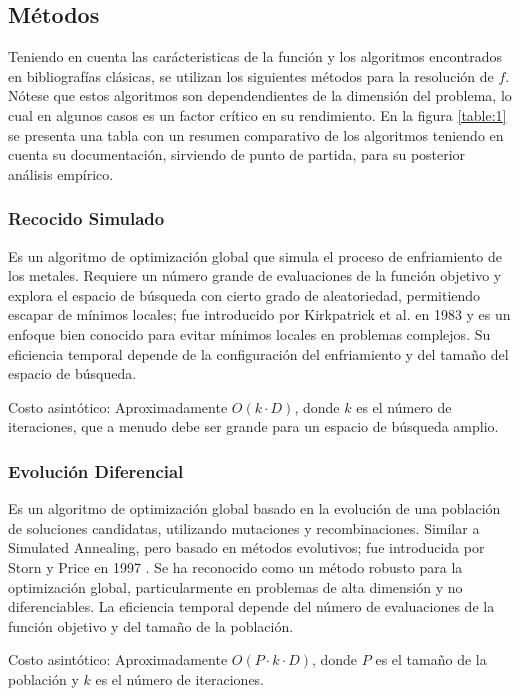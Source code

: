 \documentclass[10pt,a4paper,twocolumn]{article}
\begin{document}
		\subsection{Métodos}
		
			Teniendo en cuenta las carácteristicas de la función y los algoritmos encontrados en bibliografías clásicas, se utilizan los siguientes métodos para la resolución de $f$. Nótese que estos algoritmos son dependendientes de la dimensión del problema, lo cual en algunos casos es un factor crítico en su rendimiento. En la figura \ref*{table:1} se presenta una tabla con un resumen comparativo de los algoritmos teniendo en cuenta su documentación, sirviendo de punto de partida, para su posterior análisis empírico.
			
			\subsubsection{Recocido Simulado}
				Es un algoritmo de optimización global que simula el proceso de enfriamiento de los metales. Requiere un número grande de evaluaciones de la función objetivo y explora el espacio de búsqueda con cierto grado de aleatoriedad, permitiendo escapar de mínimos locales; fue introducido por Kirkpatrick et al. en 1983 \cite{kirkpatrick1983optimization} y es un enfoque bien conocido para evitar mínimos locales en problemas complejos. Su eficiencia temporal depende de la configuración del enfriamiento y del tamaño del espacio de búsqueda.
				
				Costo asintótico: Aproximadamente $ O(k \cdot D) $, donde $ k $ es el número de iteraciones, que a menudo debe ser grande para un espacio de búsqueda amplio.
				
				
			\subsubsection{Evolución Diferencial}
				Es un algoritmo de optimización global basado en la evolución de una población de soluciones candidatas, utilizando mutaciones y recombinaciones. Similar a Simulated Annealing, pero basado en métodos evolutivos; fue introducida por Storn y Price en 1997 \cite{storn1997differential}. Se ha reconocido como un método robusto para la optimización global, particularmente en problemas de alta dimensión y no diferenciables. La eficiencia temporal depende del número de evaluaciones de la función objetivo y del tamaño de la población.
				
				Costo asintótico: Aproximadamente $O(P \cdot k \cdot D) $, donde $ P $ es el tamaño de la población y $k$ es el número de iteraciones.
				
\end{document}
